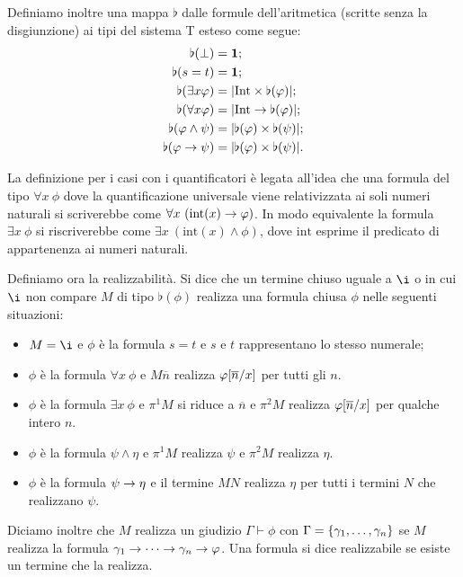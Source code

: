 \documentclass[]{marticle}
\begin{document}
Definiamo inoltre una mappa $\flat$ dalle formule dell'aritmetica (scritte senza
la disgiunzione) ai tipi del sistema T esteso come segue:
\begin{align*}
    \flat(\bot) &=\text{\textbf{1}};\\
    \flat(s=t) &= \text{\textbf{1}};\\
    \flat(\exists x \varphi) &= |\text{Int} \times \flat(\varphi)|;\\
    \flat(\forall x \varphi) &= |\text{Int} \rightarrow \flat(\varphi)|;\\
    \flat(\varphi \land \psi) &= |\flat(\varphi) \times \flat(\psi)|;\\
    \flat(\varphi \rightarrow \psi) &= |\flat(\varphi) \times \flat(\psi)|.\\
\end{align*}

La definizione per i casi con i quantificatori \`e legata all'idea che una
formula del tipo $\forall x\ \phi$ dove la quantificazione universale viene
relativizzata ai soli numeri naturali si scriverebbe come $\forall x\
(\text{int}(x) \rightarrow \varphi)$. In modo equivalente la formula $\exists x\ \phi$ si
riscriverebbe come $\exists x\ (\text{int}(x) \land \phi)$, dove $\text{int}$
esprime il predicato di appartenenza ai numeri naturali.

Definiamo ora la realizzabilit\`a. Si dice che un termine chiuso uguale a $\i$ o
in cui $\i$ non compare $M$ di tipo $\flat(\phi)$ realizza una formula chiusa
$\phi$ nelle seguenti situazioni:
\begin{itemize}
    \item $M=\i$ e $\phi$ \`e la formula $s=t$ e $s$ e $t$ rappresentano lo
        stesso numerale;
    \item $\phi$ \`e la formula $\forall x\ \phi$ e $M\overline{n}$ realizza
        $\varphi[\overline{n}/x]$ per tutti gli $n$.
    \item $\phi$ \`e la formula $\exists x\ \phi$ e $\pi^1M$ si riduce a
        $\overline{n}$ e $\pi^2M$ realizza $\varphi[\overline{n}/x]$ per
        qualche intero $n$.
    \item $\phi$ \`e la formula $\psi\land\eta$ e $\pi^1M$ realizza $\psi$ e
        $\pi^2M$ realizza $\eta$.
    \item $\phi$ \`e la formula $\psi \rightarrow \eta$ e il termine $MN$ realizza
        $\eta$ per tutti i termini $N$ che realizzano $\psi$.
\end{itemize}

Diciamo inoltre che $M$ realizza un giudizio $\Gamma \vdash\phi$ con
$\Gamma=\{\gamma_1,\dots,\gamma_n\}$ se $M$ realizza la formula
$\gamma_1\rightarrow\cdots\rightarrow\gamma_n\rightarrow \varphi$. Una formula si dice realizzabile se
esiste un termine che la realizza.
\end{document}
